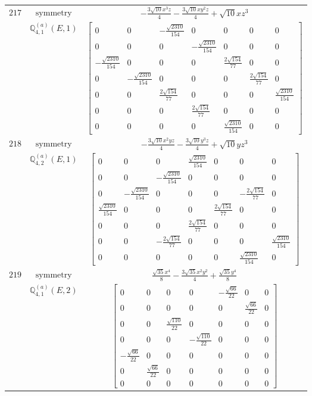 \documentclass[fleqn,8pt,landscape]{jsarticle}
\begin{document}
\begin{longtable}{ccc}
$ 217 $ & $ \text{symmetry} $ & $ - \frac{3 \sqrt{10} x^{3} z}{4} - \frac{3 \sqrt{10} x y^{2} z}{4} + \sqrt{10} x z^{3} $ \\
$  $ & $ \mathbb{Q}_{4,1}^{(a)}(E,1) $ & $ \begin{bmatrix} 0 & 0 & - \frac{\sqrt{2310}}{154} & 0 & 0 & 0 & 0 \\ 0 & 0 & 0 & - \frac{\sqrt{2310}}{154} & 0 & 0 & 0 \\ - \frac{\sqrt{2310}}{154} & 0 & 0 & 0 & \frac{2 \sqrt{154}}{77} & 0 & 0 \\ 0 & - \frac{\sqrt{2310}}{154} & 0 & 0 & 0 & \frac{2 \sqrt{154}}{77} & 0 \\ 0 & 0 & \frac{2 \sqrt{154}}{77} & 0 & 0 & 0 & \frac{\sqrt{2310}}{154} \\ 0 & 0 & 0 & \frac{2 \sqrt{154}}{77} & 0 & 0 & 0 \\ 0 & 0 & 0 & 0 & \frac{\sqrt{2310}}{154} & 0 & 0 \end{bmatrix} $ \\ \hline
$ 218 $ & $ \text{symmetry} $ & $ - \frac{3 \sqrt{10} x^{2} y z}{4} - \frac{3 \sqrt{10} y^{3} z}{4} + \sqrt{10} y z^{3} $ \\
$  $ & $ \mathbb{Q}_{4,2}^{(a)}(E,1) $ & $ \begin{bmatrix} 0 & 0 & 0 & \frac{\sqrt{2310}}{154} & 0 & 0 & 0 \\ 0 & 0 & - \frac{\sqrt{2310}}{154} & 0 & 0 & 0 & 0 \\ 0 & - \frac{\sqrt{2310}}{154} & 0 & 0 & 0 & - \frac{2 \sqrt{154}}{77} & 0 \\ \frac{\sqrt{2310}}{154} & 0 & 0 & 0 & \frac{2 \sqrt{154}}{77} & 0 & 0 \\ 0 & 0 & 0 & \frac{2 \sqrt{154}}{77} & 0 & 0 & 0 \\ 0 & 0 & - \frac{2 \sqrt{154}}{77} & 0 & 0 & 0 & \frac{\sqrt{2310}}{154} \\ 0 & 0 & 0 & 0 & 0 & \frac{\sqrt{2310}}{154} & 0 \end{bmatrix} $ \\ \hline
$ 219 $ & $ \text{symmetry} $ & $ \frac{\sqrt{35} x^{4}}{8} - \frac{3 \sqrt{35} x^{2} y^{2}}{4} + \frac{\sqrt{35} y^{4}}{8} $ \\
$  $ & $ \mathbb{Q}_{4,1}^{(a)}(E,2) $ & $ \begin{bmatrix} 0 & 0 & 0 & 0 & - \frac{\sqrt{66}}{22} & 0 & 0 \\ 0 & 0 & 0 & 0 & 0 & \frac{\sqrt{66}}{22} & 0 \\ 0 & 0 & \frac{\sqrt{110}}{22} & 0 & 0 & 0 & 0 \\ 0 & 0 & 0 & - \frac{\sqrt{110}}{22} & 0 & 0 & 0 \\ - \frac{\sqrt{66}}{22} & 0 & 0 & 0 & 0 & 0 & 0 \\ 0 & \frac{\sqrt{66}}{22} & 0 & 0 & 0 & 0 & 0 \\ 0 & 0 & 0 & 0 & 0 & 0 & 0 \end{bmatrix} $ \\ \hline

\end{longtable}
\end{document}
